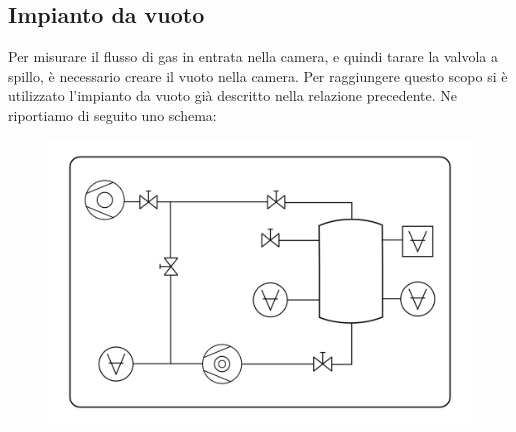\documentclass[a4paper,11pt]{article}
\begin{document}
\subsection{Impianto da vuoto}
Per misurare il flusso di gas in entrata nella camera, e quindi tarare la valvola a spillo, è necessario creare il vuoto nella camera. Per raggiungere questo scopo si è utilizzato l'impianto da vuoto già descritto nella relazione precedente. Ne riportiamo di seguito uno schema:
\vspace{-10 pt} 
 \begin{center} 
\begin{figure}[htpd]
\hspace{20 pt}
\includegraphics[scale=0.4]{schema_finale.png}


\end{figure}
\end{center}
\end{document}
